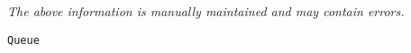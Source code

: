 \label{pkg:queue}

{\tiny \it The above information is manually maintained and may contain errors.}
\begin{verbatim}
Queue
\end{verbatim}
